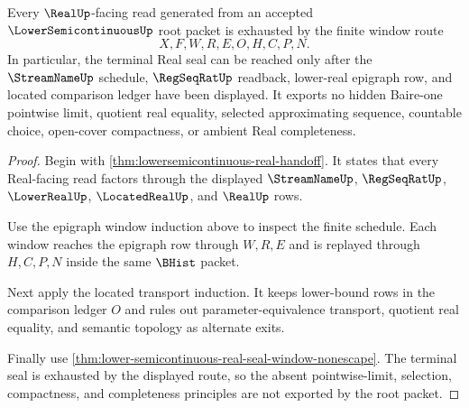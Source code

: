 \begin{theorem}
\label{thm:lowersemicontinuous-real-seal-window-exhaustion}
Every $\RealUp$-facing read generated from an accepted $\LowerSemicontinuousUp$ root packet is exhausted by the finite window route
$$
X,F,W,R,E,O,H,C,P,N .
$$
In particular, the terminal Real seal can be reached only after the $\StreamNameUp$ schedule, $\RegSeqRatUp$ readback, lower-real epigraph row, and located comparison ledger have been displayed. It exports no hidden Baire-one pointwise limit, quotient real equality, selected approximating sequence, countable choice, open-cover compactness, or ambient Real completeness.
\end{theorem}
\begin{proof}
Begin with \autoref{thm:lowersemicontinuous-real-handoff}. It states that every Real-facing read factors through the displayed $\StreamNameUp$, $\RegSeqRatUp$, $\LowerRealUp$, $\LocatedRealUp$, and $\RealUp$ rows.

Use the epigraph window induction above to inspect the finite schedule. Each window reaches the epigraph row through $W,R,E$ and is replayed through $H,C,P,N$ inside the same $\BHist$ packet.

Next apply the located transport induction. It keeps lower-bound rows in the comparison ledger $O$ and rules out parameter-equivalence transport, quotient real equality, and semantic topology as alternate exits.

Finally use \autoref{thm:lower-semicontinuous-real-seal-window-nonescape}. The terminal seal is exhausted by the displayed route, so the absent pointwise-limit, selection, compactness, and completeness principles are not exported by the root packet.
\end{proof}
